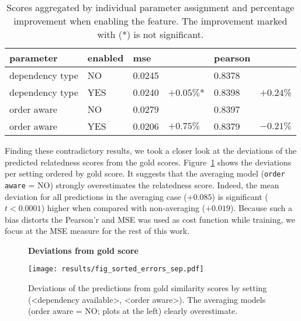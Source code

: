 \begin{table}[htb!]
	\centering
	\begin{tabularx}{\textwidth}{|p{} p{}|X X|X X|} 
		\hline
		parameter & enabled & mse & & pearson  & \\ \hline \hline
		dependency type & NO & 0.0245 & & 0.8378 & \\
		dependency type & YES & 0.0240 & $+0.05\%$* & 0.8398 & $+0.24$\% \\ \hline
		order aware & NO & 0.0279 &  & 0.8397 &  \\
		order aware & YES & 0.0206 & $+0.75\%$ & 0.8379 & $-0.21\%$ \\ \hline	   		
	\end{tabularx}
	\caption{Scores aggregated by individual parameter assignment and percentage improvement when enabling the feature. The improvement marked with (*) is not significant.}
	\label{tab:results_merged}
\end{table}

Finding these contradictory results, we took a closer look at the deviations of the predicted relatedness scores from the gold scores. Figure~\ref{fig:fig_sorted_errors_sep} shows the deviations per setting ordered by gold score. It suggests that the averaging model (\texttt{order aware} = NO) strongly overestimates the relatedness score. Indeed, the mean deviation for all predictions in the averaging case ($+0.085$) is significant ($t < 0.0001$) higher when compared with non-averaging ($+0.019$). Because such a bias distorts the Pearson'r and \ac{MSE} was used as cost function while training, we focus at the \ac{MSE} measure for the rest of this work.

\begin{figure}[htb!]
	\centering
	\textbf{Deviations from gold score}\par\medskip
	\texttt{[image: results/fig\_sorted\_errors\_sep.pdf]}
	\caption{Deviations of the predictions from gold similarity scores by setting (<dependency available>, <order aware>). The averaging models (order aware = NO; plots at the left) clearly overestimate.}
	\label{fig:fig_sorted_errors_sep}
\end{figure}

